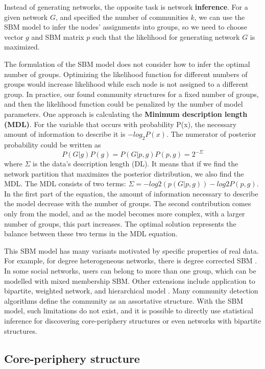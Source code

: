 Instead of generating networks, the opposite task is network \textbf{inference}. For a given network $G$, and specified the number of communities $k$, we can use the SBM model to infer the nodes' assignments into groups, so we need to choose vector $g$ and SBM matrix $p$ such that the likelihood for generating network $G$ is maximized. 

The formulation of the SBM model does not consider how to infer the optimal number of groups. Optimizing the likelihood function for different numbers of groups would increase likelihood while each node is not assigned to a different group. In practice, our found community structures for a fixed number of groups, and then the likelihood function could be penalized by the number of model parameters. One approach is calculating the \textbf{Minimum description length (MDL)}. For the variable that occurs with probability P(x), the necessary amount of information to describe it is $-log_2P(x)$. The numerator of posterior probability could be written as
\begin{equation}
P(G|g)P(g) = P(G|p, g)P(p, g)=2^{-\Sigma}
\end{equation}
where $\Sigma$ is the data's description length (DL). It means that if we find the network partition that maximizes the posterior distribution, we also find the MDL. The MDL consists of two terms: $\Sigma = -log2(p(G|p,g))-log2P(p,g)$. In the first part of the equation, the amount of information necessary to describe the model decrease with the number of groups. The second contribution comes only from the model, and as the model becomes more complex, with a larger number of groups, this part increases. The optimal solution represents the balance between these two terms in the MDL equation.  

This SBM model has many variants motivated by specific properties of real data. For example, for degree heterogeneous networks, there is degree corrected SBM \cite{karrer2011stochastic}. In some social networks, users can belong to more than one group, which can be modelled with mixed membership SBM. Other extensions include application to bipartite, weighted network, and hierarchical model \cite{funke2019}. Many community detection algorithms define the community as an assortative structure. With the SBM model, such limitations do not exist, and it is possible to directly use statistical inference for discovering core-periphery structures or even networks with bipartite structures.  

\subsection{Core-periphery structure}


